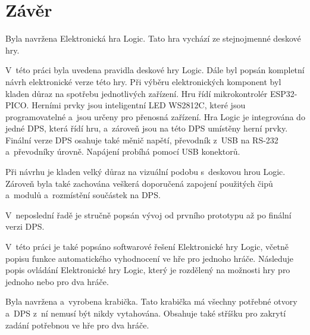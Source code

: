 \chapter*{Závěr}
{}

Byla navržena Elektronická hra Logic. Tato hra vychází ze stejnojmenné deskové hry.

V~této práci byla uvedena pravidla deskové hry Logic. Dále byl popsán kompletní návrh elektronické verze této hry. Při výběru elektronických 
komponent byl kladen důraz na spotřebu jednotlivých zařízení. Hru řídí mikrokontrolér ESP32-PICO. Herními prvky jsou inteligentní LED WS2812C, 
které jsou programovatelné a~jsou určeny pro přenosná zařízení. Hra Logic je integrována do jedné DPS, která řídí hru, a~zároveň jsou na této 
DPS umístěny herní prvky. Finální verze DPS osahuje také měnič napětí, převodník z~USB na RS-232 a~převodníky úrovně. Napájení probíhá pomocí
USB konektorů.

Při návrhu je kladen velký důraz na vizuální podobu s~deskovou hrou Logic. Zároveň byla také zachována veškerá doporučená zapojení použitých 
čipů a~modulů a~rozmístění součástek na DPS.

V~neposlední řadě je stručně popsán vývoj od prvního prototypu až po finální verzi DPS. 

V~této práci je také popsáno softwarové řešení Elektronické hry Logic, včetně popisu funkce automatického vyhodnocení ve hře pro jednoho hráče.
Následuje popis ovládání Elektronické hry Logic, který je rozdělený na možnosti hry pro jednoho nebo pro dva hráče. 

Byla navržena a~vyrobena krabička. Tato krabička má všechny potřebné otvory a~DPS z~ní nemusí být nikdy vytahována. Obsahuje také stříšku pro
zakrytí zadání potřebnou ve hře pro dva hráče. 